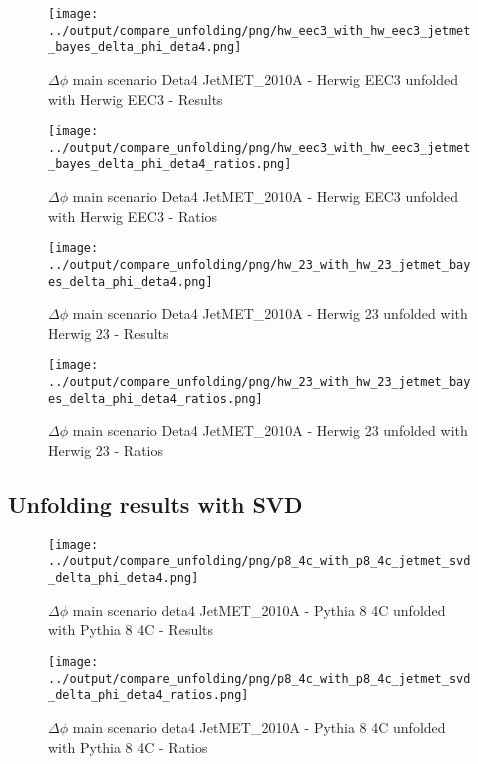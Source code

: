 \documentclass[11pt]{book}
\begin{document}
\begin{figure}[ht]
\centering
\texttt{[image: ../output/compare\_unfolding/png/hw\_eec3\_with\_hw\_eec3\_jetmet\_bayes\_delta\_phi\_deta4.png]}
\caption{$\Delta\phi$ main scenario Deta4 JetMET\_2010A - Herwig EEC3 unfolded with Herwig EEC3 - Results}
\label{hw_eec3_hw_eec3_jetmet_bayes_delta_phi_deta4_a}
\end{figure}

\begin{figure}[ht]
\centering
\texttt{[image: ../output/compare\_unfolding/png/hw\_eec3\_with\_hw\_eec3\_jetmet\_bayes\_delta\_phi\_deta4\_ratios.png]}
\caption{$\Delta\phi$ main scenario Deta4 JetMET\_2010A - Herwig EEC3 unfolded with Herwig EEC3 - Ratios}
\label{hw_eec3_hw_eec3_jetmet_bayes_delta_phi_deta4_b}
\end{figure}

\begin{figure}[ht]
\centering
\texttt{[image: ../output/compare\_unfolding/png/hw\_23\_with\_hw\_23\_jetmet\_bayes\_delta\_phi\_deta4.png]}
\caption{$\Delta\phi$ main scenario Deta4 JetMET\_2010A - Herwig 23 unfolded with Herwig 23 - Results}
\label{hw_23_hw_23_jetmet_bayes_delta_phi_deta4_a}
\end{figure}

\begin{figure}[ht]
\centering
\texttt{[image: ../output/compare\_unfolding/png/hw\_23\_with\_hw\_23\_jetmet\_bayes\_delta\_phi\_deta4\_ratios.png]}
\caption{$\Delta\phi$ main scenario Deta4 JetMET\_2010A - Herwig 23 unfolded with Herwig 23 - Ratios}
\label{hw_23_hw_23_jetmet_bayes_delta_phi_deta4_b}
\end{figure}

\clearpage
\subsection{Unfolding results with SVD}

\begin{figure}[ht]
\centering
\texttt{[image: ../output/compare\_unfolding/png/p8\_4c\_with\_p8\_4c\_jetmet\_svd\_delta\_phi\_deta4.png]}
\caption{$\Delta\phi$ main scenario deta4 JetMET\_2010A - Pythia 8 4C unfolded with Pythia 8 4C - Results}
\label{p8_p8_jetmet_svd_delta_phi_deta4_a}
\end{figure}

\begin{figure}[ht]
\centering
\texttt{[image: ../output/compare\_unfolding/png/p8\_4c\_with\_p8\_4c\_jetmet\_svd\_delta\_phi\_deta4\_ratios.png]}
\caption{$\Delta\phi$ main scenario deta4 JetMET\_2010A - Pythia 8 4C unfolded with Pythia 8 4C - Ratios}
\label{p8_p8_jetmet_svd_delta_phi_deta4_b}
\end{figure}
\end{document}
